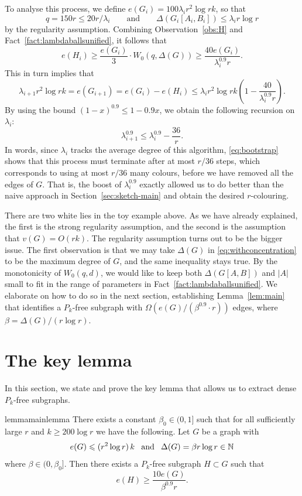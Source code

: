 \documentclass[12pt,reqno]{amsart}
\theoremstyle{remark}
\numberwithin{theorem}{section}
\renewcommand{\(}{\bigl(}
\renewcommand{\)}{\bigr)\vphantom{)}}
\renewcommand{\leq}{\le}
\renewcommand{\geq}{\ge}
\renewcommand{\le}{\leqslant}
\renewcommand{\ge}{\geqslant}
\newcommand{\NN}{\mathbb{N}}
\begin{document}
To analyse this process, we define $e(G_i)=100\lambda_ir^2\log r k$, so that \[q=150r\leq20r/\lambda_i \qquad \text{and}\qquad \Delta(G_i[A_i,B_i])\leq\lambda_ir\log r\]
by the regularity assumption. Combining Observation~\ref{obs:H} and Fact~\ref{fact:lambdaballsunified}, it follows that
\[ e(H_i)\geq \frac{e(G_i)}{3}\cdot W_0(q,\Delta(G))\geq\frac{40e(G_i)}{\lambda_i^{0.9} r}.\]
This in turn implies that
\[\lambda_{i+1}r^2\log r k=e(G_{i+1})=e(G_i)-e(H_i)\leq \lambda_{i}r^2\log r k\left(1-\frac{40}{\lambda_i^{0.9} r}\right).\]
By using the bound $(1-x)^{0.9}\leq 1-0.9x$, we obtain the following recursion on $\lambda_i$:
\begin{equation}\label{eq:bootstrap}
    \lambda_{i+1}^{0.9}\leq \lambda_i^{0.9}-\frac{36}{r}.
\end{equation}
In words, since $\lambda_i$ tracks the average degree of this algorithm, \eqref{eq:bootstrap} shows that this process must terminate after at most $r/36$ steps, which corresponds to using at most $r/36$ many colours, before we have removed all the edges of $G$. That is, the boost of $\lambda_i^{0.9}$ exactly allowed us to do better than the naive approach in Section~\ref{sec:sketch-main} and obtain the desired $r$-colouring.

There are two white lies in the toy example above. As we have already explained, the first is the strong regularity assumption, and the second is the assumption that $v(G)=O(rk)$. The regularity assumption turns out to be the bigger issue. The first observation is that we may take $\Delta(G)$ in \eqref{eq:withconcentration} to be the maximum degree of $G$, and the same inequality stays true. By the monotonicity of $W_0(q,d)$, we would like to keep both $\Delta(G[A,B])$ and $|A|$ small to fit in the range of parameters in Fact~\ref{fact:lambdaballsunified}. We elaborate on how to do so in the next section, establishing Lemma~\ref{lem:main} that identifies a $P_k$-free subgraph with $\Omega(e(G)/(\beta^{0.9}\cdot r))$ edges, where $\beta=\Delta(G)/(r\log r)$.

\section{The key lemma}\label{sec:key-lemma} 

In this section, we state and prove the key lemma that allows us to extract dense $P_k$-free subgraphs.

\begin{restatable}{lemma}{mainlemma}\label{lem:main}
There exists a constant $\beta_0 \in (0,1]$ such that for all sufficiently large $r$ and $k\geq 200\log r$ we have the following. Let $G$ be a graph with 
\[e(G) \leq (r^2 \log r) \, k\hspace{0.8em} \text{and} \hspace{0.8em}\Delta(G) = \beta r \log r\in \NN \]
where $\beta \in (0,\beta_0]$.
Then there exists a $P_k$-free subgraph $H \subset G$ such that \[e(H) \geq \dfrac{10 e(G)}{\beta^{0.9} r}.\] 
\end{restatable}
\end{document}
